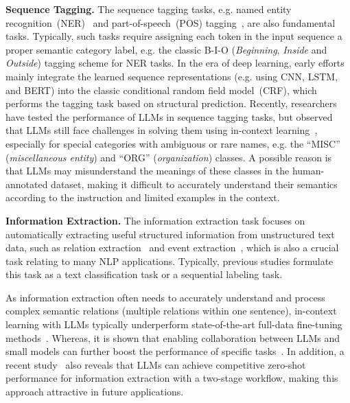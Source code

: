 {{\textbf{Sequence Tagging.} The sequence tagging tasks, e.g. named entity recognition~(NER)~\cite{Nadeau-Lingvisticae-2007-NER} and part-of-speech~(POS) tagging~\cite{Ratnaparkhi-EMNLP-1996-maximum}, are also fundamental tasks. Typically, such tasks require assigning each token in the input sequence a proper semantic category label, e.g. the classic B-I-O (\emph{Beginning}, \emph{Inside} and \emph{Outside}) tagging scheme for NER tasks. In the era of deep learning, early efforts~\cite{Yadav-COLING-2018-survey,Souza-arxiv-2019-portuguese} mainly integrate the learned sequence representations (e.g. using CNN, LSTM, and BERT) into the classic conditional random field model~(CRF), which performs the tagging task based on structural  prediction. Recently, researchers have tested the performance of  LLMs in sequence tagging tasks, but observed that LLMs still face challenges in solving them using in-context learning~\cite{Qin-arxiv-2023-Is}, especially for special categories with ambiguous or rare names, e.g. the ``MISC'' (\emph{miscellaneous entity}) and ``ORG'' (\emph{organization}) classes. A possible reason is that LLMs may misunderstand the meanings of these classes in the human-annotated dataset, making it difficult to accurately  understand their semantics according to the instruction and limited examples in the context.

\textbf{Information Extraction.} The information extraction task focuses on automatically extracting useful structured information from unstructured text data, such as relation extraction~\cite{Pawar-arxiv-2017-relation} and event extraction~\cite{walker-ldc-2006-ace}, which is also a crucial task relating to many NLP applications. Typically, previous studies formulate this task as a text classification task or a sequential labeling task.

{As information extraction often needs to accurately understand and process complex semantic relations  (multiple relations within one sentence),  in-context learning with LLMs typically underperform state-of-the-art full-data fine-tuning methods~\cite{gao-arxiv-2023-exploring,ma-arxiv-2023-Large}.} Whereas, it is shown that enabling collaboration between LLMs and small models can further boost the performance of specific tasks~\cite{tang-arxiv-2023-does,ma-arxiv-2023-Large}. In addition, a recent study~\cite{wei-arxiv-2023-zero} also reveals that LLMs can achieve competitive zero-shot performance for information extraction with a two-stage workflow, making this approach attractive in future applications.

}}

